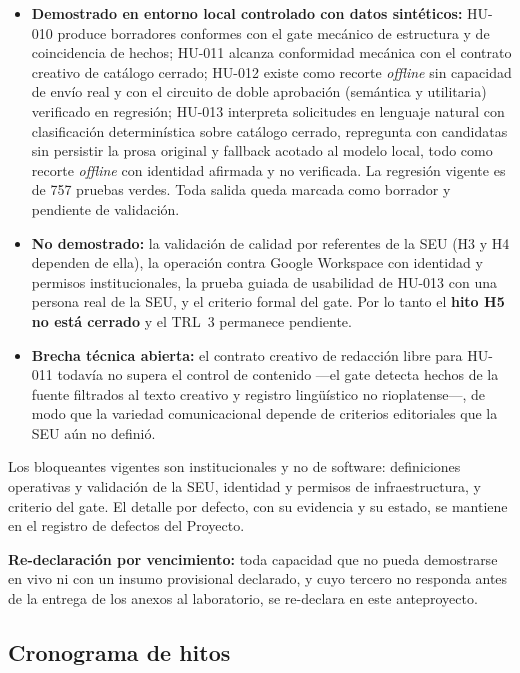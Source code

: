 \documentclass[a4paper, 12pt]{article}
\begin{document}
\begin{itemize}
  \item \textbf{Demostrado en entorno local controlado con datos sint\'eticos:} HU-010 produce borradores conformes con el gate mec\'anico de estructura y de coincidencia de hechos; HU-011 alcanza conformidad mec\'anica con el contrato creativo de cat\'alogo cerrado; HU-012 existe como recorte \emph{offline} sin capacidad de env\'io real y con el circuito de doble aprobaci\'on (sem\'antica y utilitaria) verificado en regresi\'on; HU-013 interpreta solicitudes en lenguaje natural con clasificaci\'on determin\'istica sobre cat\'alogo cerrado, repregunta con candidatas sin persistir la prosa original y fallback acotado al modelo local, todo como recorte \emph{offline} con identidad afirmada y no verificada. La regresi\'on vigente es de 757 pruebas verdes. Toda salida queda marcada como borrador y pendiente de validaci\'on.
  \item \textbf{No demostrado:} la validaci\'on de calidad por referentes de la \ac{SEU} (H3 y H4 dependen de ella), la operaci\'on contra Google Workspace con identidad y permisos institucionales, la prueba guiada de usabilidad de HU-013 con una persona real de la \ac{SEU}, y el criterio formal del gate. Por lo tanto el \textbf{hito H5 no est\'a cerrado} y el \ac{TRL}~3 permanece pendiente.
  \item \textbf{Brecha t\'ecnica abierta:} el contrato creativo de redacci\'on libre para HU-011 todav\'ia no supera el control de contenido ---el gate detecta hechos de la fuente filtrados al texto creativo y registro ling\"u\'istico no rioplatense---, de modo que la variedad comunicacional depende de criterios editoriales que la \ac{SEU} a\'un no defini\'o.
\end{itemize}

\noindent Los bloqueantes vigentes son institucionales y no de software: definiciones operativas y validaci\'on de la \ac{SEU}, identidad y permisos de infraestructura, y criterio del gate. El detalle por defecto, con su evidencia y su estado, se mantiene en el registro de defectos del Proyecto.

\noindent\textbf{Re-declaraci\'on por vencimiento:} toda capacidad que no pueda demostrarse en vivo ni con un insumo provisional declarado, y cuyo tercero no responda antes de la entrega de los anexos al laboratorio, se re-declara en este anteproyecto.

\subsection{Cronograma de hitos}
\end{document}
